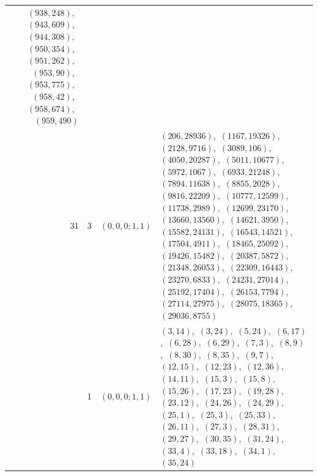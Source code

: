 \documentclass[11pt]{article}
\begin{document}
\begin{longtable}{@{}rrl>{\raggedright\arraybackslash}p{}@{}}
$(938,248)$,\allowbreak\ $(943,609)$,\allowbreak\ $(944,308)$,\allowbreak\ $(950,354)$,\allowbreak\ $(951,262)$,\allowbreak\ $(953,90)$,\allowbreak\ $(953,775)$,\allowbreak\ $(958,42)$,\allowbreak\ $(958,674)$,\allowbreak\ $(959,490)$\\
31 & 3 & $(0,0,0;1,1)$ & $(206,28936)$,\allowbreak\ $(1167,19326)$,\allowbreak\ $(2128,9716)$,\allowbreak\ $(3089,106)$,\allowbreak\ $(4050,20287)$,\allowbreak\ $(5011,10677)$,\allowbreak\ $(5972,1067)$,\allowbreak\ $(6933,21248)$,\allowbreak\ $(7894,11638)$,\allowbreak\ $(8855,2028)$,\allowbreak\ $(9816,22209)$,\allowbreak\ $(10777,12599)$,\allowbreak\ $(11738,2989)$,\allowbreak\ $(12699,23170)$,\allowbreak\ $(13660,13560)$,\allowbreak\ $(14621,3950)$,\allowbreak\ $(15582,24131)$,\allowbreak\ $(16543,14521)$,\allowbreak\ $(17504,4911)$,\allowbreak\ $(18465,25092)$,\allowbreak\ $(19426,15482)$,\allowbreak\ $(20387,5872)$,\allowbreak\ $(21348,26053)$,\allowbreak\ $(22309,16443)$,\allowbreak\ $(23270,6833)$,\allowbreak\ $(24231,27014)$,\allowbreak\ $(25192,17404)$,\allowbreak\ $(26153,7794)$,\allowbreak\ $(27114,27975)$,\allowbreak\ $(28075,18365)$,\allowbreak\ $(29036,8755)$\\
\addlinespace[3pt]
37 & 1 & $(0,0,0;1,1)$ & $(3,14)$,\allowbreak\ $(3,24)$,\allowbreak\ $(5,24)$,\allowbreak\ $(6,17)$,\allowbreak\ $(6,28)$,\allowbreak\ $(6,29)$,\allowbreak\ $(7,3)$,\allowbreak\ $(8,9)$,\allowbreak\ $(8,30)$,\allowbreak\ $(8,35)$,\allowbreak\ $(9,7)$,\allowbreak\ $(12,15)$,\allowbreak\ $(12,23)$,\allowbreak\ $(12,36)$,\allowbreak\ $(14,11)$,\allowbreak\ $(15,3)$,\allowbreak\ $(15,8)$,\allowbreak\ $(15,26)$,\allowbreak\ $(17,23)$,\allowbreak\ $(19,28)$,\allowbreak\ $(23,12)$,\allowbreak\ $(24,26)$,\allowbreak\ $(24,29)$,\allowbreak\ $(25,1)$,\allowbreak\ $(25,3)$,\allowbreak\ $(25,33)$,\allowbreak\ $(26,11)$,\allowbreak\ $(27,3)$,\allowbreak\ $(28,31)$,\allowbreak\ $(29,27)$,\allowbreak\ $(30,35)$,\allowbreak\ $(31,24)$,\allowbreak\ $(33,4)$,\allowbreak\ $(33,18)$,\allowbreak\ $(34,1)$,\allowbreak\ $(35,24)$\\

\end{longtable}
\end{document}
